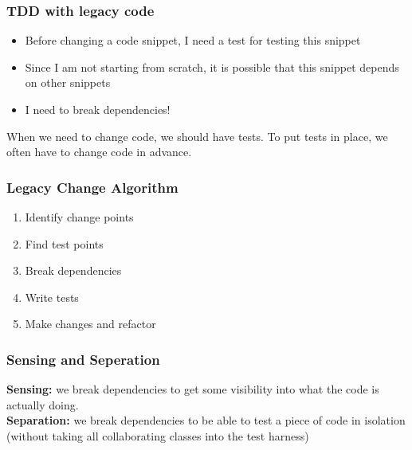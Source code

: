 \hypertarget{tdd-with-legacy-code}{%
\subsubsection{TDD with legacy code}\label{tdd-with-legacy-code}}

\begin{itemize}
\tightlist
\item
  Before changing a code snippet, I need a test for testing this snippet
\item
  Since I am not starting from scratch, it is possible that this snippet
  depends on other snippets
\item
  I need to break dependencies!
\end{itemize}

\begin{tcolorbox}[colback=red!5!white,colframe=red!75!black]
When we need to change code, we should have tests. To put tests in place, we often have to change code in advance.
\end{tcolorbox}

\hypertarget{legacy-change-algorithm}{%
\subsubsection{Legacy Change Algorithm}\label{legacy-change-algorithm}}

\begin{enumerate}
\def\labelenumi{\arabic{enumi}.}
\tightlist
\item
  Identify change points
\item
  Find test points
\item
  Break dependencies
\item
  Write tests
\item
  Make changes and refactor
\end{enumerate}

\hypertarget{sensing-and-seperation}{%
\subsubsection{Sensing and Seperation}\label{sensing-and-seperation}}

\textbf{Sensing:} we break dependencies to get some visibility into what
the code is actually doing. \\
\textbf{Separation:} we break dependencies
to be able to test a piece of code in isolation (without taking all
collaborating classes into the test harness)

